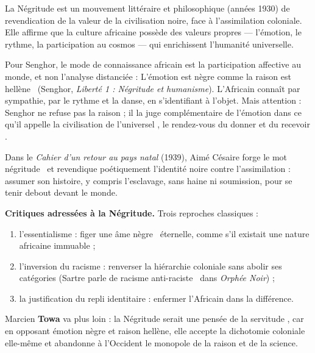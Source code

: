 \documentclass[11pt]{article}
\newcommand{\cle}[1]{{\popxbold\color{popdark}#1}}
\begin{document}
\begin{definition}[Négritude]
La \cle{Négritude} est un mouvement littéraire et philosophique (années 1930) de revendication de la valeur de la civilisation noire, face à l'assimilation coloniale. Elle affirme que la culture africaine possède des valeurs propres — l'émotion, le rythme, la participation au cosmos — qui enrichissent l'humanité universelle.
\end{definition}

\begin{propriete}
Pour Senghor, le mode de connaissance africain est la participation affective au monde, et non l'analyse distanciée : \guillemotleft L'émotion est nègre comme la raison est hellène \guillemotright\ (Senghor, \emph{Liberté 1 : Négritude et humanisme}). L'Africain connaît par sympathie, par le rythme et la danse, en s'identifiant à l'objet. Mais attention : Senghor ne refuse pas la raison ; il la juge complémentaire de l'émotion dans ce qu'il appelle la \guillemotleft civilisation de l'universel \guillemotright, le \guillemotleft rendez-vous du donner et du recevoir \guillemotright.
\end{propriete}

\begin{propriete}
Dans le \emph{Cahier d'un retour au pays natal} (1939), Aimé Césaire forge le mot \guillemotleft négritude \guillemotright\ et revendique poétiquement l'identité noire contre l'assimilation : assumer son histoire, y compris l'esclavage, sans haine ni soumission, pour se tenir debout devant le monde.
\end{propriete}

\textbf{Critiques adressées à la Négritude.} Trois reproches classiques :
\begin{enumerate}
\item l'\cle{essentialisme} : figer une \guillemotleft âme nègre \guillemotright\ éternelle, comme s'il existait une nature africaine immuable ;
\item l'inversion du racisme : renverser la hiérarchie coloniale sans abolir ses catégories (Sartre parle de \guillemotleft racisme anti-raciste \guillemotright\ dans \emph{Orphée Noir}) ;
\item la justification du repli identitaire : enfermer l'Africain dans la différence.
\end{enumerate}
Marcien \textbf{Towa} va plus loin : la Négritude serait une \guillemotleft pensée de la servitude \guillemotright, car en opposant émotion nègre et raison hellène, elle accepte la dichotomie coloniale elle-même et abandonne à l'Occident le monopole de la raison et de la science.
\end{document}
